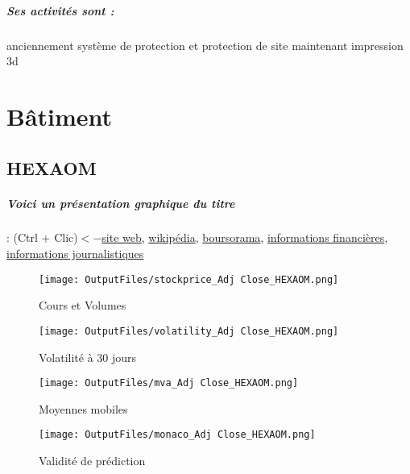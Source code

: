 \documentclass[11pt,a4paper]{report}%
\begin{document}
\paragraph{Ses activités sont : } anciennement système de protection et protection de site maintenant impression 3d 
    
    \newpage\chapter{Bâtiment}


\section{HEXAOM}

\paragraph{Voici un présentation graphique du titre} : (Ctrl + Clic)$<-$\href{https://www.hexaom.fr/}{site web}, \href{https://fr.wikipedia.org/wiki/Hexaom}{wikipédia}, \href{https://www.boursorama.com/cours/1rPHEXA}{boursorama}, \href{https://www.qwant.com/?q=site:https:%2f%2fwww.easybourse.com%2faction-societe%2fHEXAOM&t=web&client=ext-firefox-hp}{informations financières}, \href{https://bourse.lerevenu.com/cours-de-bourse/fiche-valeur-synthese/HEXAOM/HEXA-FR}{informations journalistiques}
\begin{figure}[!htb]
   \begin{minipage}{0.5\textwidth}
     \centering
     \texttt{[image: OutputFiles/stockprice\_Adj Close\_HEXAOM.png]}
     \caption{Cours et Volumes}\label{Fig:price_HEXAOM}
   \end{minipage}\hfill
   \begin{minipage}{0.5\textwidth}
     \centering
     \texttt{[image: OutputFiles/volatility\_Adj Close\_HEXAOM.png]}
     \caption{Volatilité à 30 jours}\label{Fig:volat_HEXAOM}
   \end{minipage}
\end{figure}
\begin{figure}[!htb]
   \begin{minipage}{0.5\textwidth}
     \centering
     \texttt{[image: OutputFiles/mva\_Adj Close\_HEXAOM.png]}
     \caption{Moyennes mobiles}\label{Fig:mva_HEXAOM}
   \end{minipage}\hfill
   \begin{minipage}{0.5\textwidth}
     \centering
     \texttt{[image: OutputFiles/monaco\_Adj Close\_HEXAOM.png]}
     \caption{Validité de prédiction}\label{Fig:prediction_HEXAOM}
   \end{minipage}
\end{figure}
\end{document}
